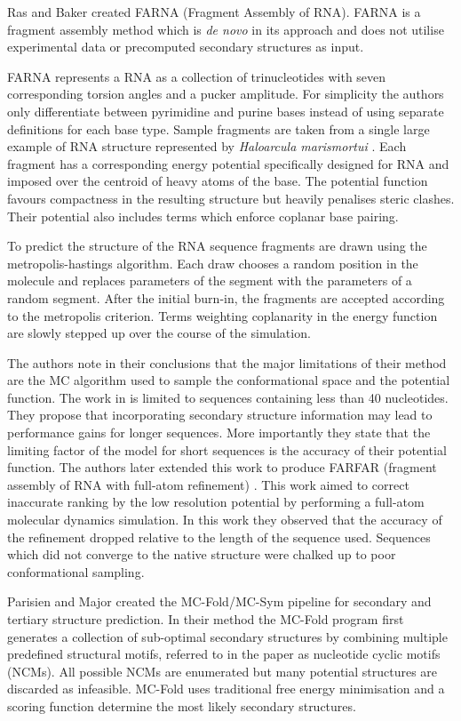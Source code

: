 \documentclass[journal]{IEEEtran}
\begin{document}
Ras and Baker \cite{das2007automated} created FARNA (Fragment Assembly of RNA). FARNA is a fragment assembly method which is \textit{de novo} in its approach and does not utilise experimental data or precomputed secondary structures as input.

FARNA represents a RNA as a collection of trinucleotides with seven corresponding torsion angles and a pucker amplitude. For simplicity the authors only differentiate between pyrimidine and purine bases instead of using separate definitions for each base type. Sample fragments are taken from a single large example of RNA structure represented by \textit{Haloarcula marismortui} \cite{ban2000complete}. Each fragment has a corresponding energy potential specifically designed for RNA and imposed over the centroid of heavy atoms of the base. The potential function favours compactness in the resulting structure but heavily penalises steric clashes. Their potential also includes terms which enforce coplanar base pairing. 

To predict the structure of the RNA sequence fragments are drawn using the metropolis-hastings algorithm. Each draw chooses a random position in the molecule and replaces parameters of the segment with the parameters of a random segment. After the initial burn-in, the fragments are accepted according to the metropolis criterion. Terms weighting coplanarity in the energy function are slowly stepped up over the course of the simulation.

The authors note in their conclusions that the major limitations of their method are the MC algorithm used to sample the conformational space and the potential function. The work in \cite{das2007automated} is limited to sequences containing less than 40 nucleotides. They propose that incorporating secondary structure information may lead to performance gains for longer sequences. More importantly they state that the limiting factor of the model for short sequences is the accuracy of their potential function. The authors later extended this work to produce FARFAR (fragment assembly of RNA with full-atom refinement) \cite{das2010atomic}. This work aimed to correct inaccurate ranking by the low resolution potential by performing a full-atom molecular dynamics simulation. In this work they observed that the accuracy of the refinement dropped relative to the length of the sequence used. Sequences which did not converge to the native structure were chalked up to poor conformational sampling.

Parisien and Major\cite{parisien2008mc} created the MC-Fold/MC-Sym pipeline for secondary and tertiary structure prediction. In their method the MC-Fold program first generates a collection of sub-optimal secondary structures by combining multiple predefined structural motifs, referred to in the paper as nucleotide cyclic motifs (NCMs). All possible NCMs are enumerated but many potential structures are discarded as infeasible. MC-Fold uses traditional free energy minimisation and a scoring function determine the most likely secondary structures.
\end{document}
